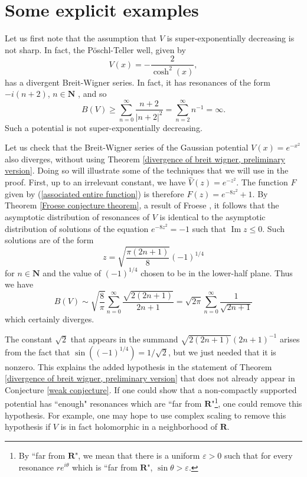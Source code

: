 \documentclass[12pt]{report}
\newcommand{\NN}{\mathbf{N}}
\newcommand{\RR}{\mathbf{R}}
\renewcommand{\Im}{\operatorname{Im}}
\theoremstyle{definition}
\begin{document}
\section{Some explicit examples}
Let us first note that the assumption that $V$ is super-exponentially decreasing is not sharp. In fact, the P\"oschl-Teller well, given by
$$V(x) = -\frac{2}{\cosh^2(x)},$$
has a divergent Breit-Wigner series. In fact, it has resonances of the form $-i(n+2)$, $n \in \NN$ \cite{cevik_2016}, and so
$$B(V) \geq \sum_{n=0}^\infty \frac{n+2}{|n+2|^2} = \sum_{n=2}^\infty n^{-1} = \infty.$$
Such a potential is not super-exponentially decreasing.

Let us check that the Breit-Wigner series of the Gaussian potential $V(x) = e^{-x^2}$ also diverges, without using Theorem \ref{divergence of breit wigner, preliminary version}.
Doing so will illustrate some of the techniques that we will use in the proof. First, up to an irrelevant constant, we have $\hat V(z) = e^{-z^2}$. The function $F$ given by (\ref{associated entire function}) is therefore $F(z) = e^{-8z^2} + 1$.
By Theorem \ref{Froese conjecture theorem}, a result of Froese \cite[Theorem 1.2]{froese1997asymptotic}, it follows that the asymptotic distribution of resonances of $V$ is identical to the asymptotic distribution of solutions of the equation $e^{-8z^2} = -1$ such that $\Im z \leq 0$. Such solutions are of the form
$$z = \sqrt{\frac{\pi(2n + 1)}{8}}(-1)^{1/4}$$
for $n \in \NN$ and the value of $(-1)^{1/4}$ chosen to be in the lower-half plane.
Thus we have
$$B(V) \sim \sqrt{\frac{8}{\pi}} \sum_{n=0}^\infty \frac{\sqrt{2(2n+1)}}{2n + 1} = \sqrt{2\pi} \sum_{n=0}^\infty \frac{1}{\sqrt{2n+1}}$$
which certainly diverges.

The constant $\sqrt 2$ that appears in the summand $\sqrt{2(2n+1)}(2n+1)^{-1}$ arises from the fact that $\sin((-1)^{1/4}) = 1/\sqrt 2$, but we just needed that it is nonzero.
This explains the added hypothesis in the statement of Theorem \ref{divergence of breit wigner, preliminary version} that does not already appear in Conjecture \ref{weak conjecture}.
If one could show that a non-compactly supported potential has ``enough" resonances which are ``far from $\RR$"\footnote{By ``far from $\RR$", we mean that there is a uniform $\varepsilon > 0$ such that for every resonance $re^{i\theta}$ which is ``far from $\RR$", $\sin \theta > \varepsilon$.}, one could remove this hypothesis.
For example, one may hope to use complex scaling to remove this hypothesis if $V$ is in fact holomorphic in a neighborhood of $\RR$.
\end{document}
